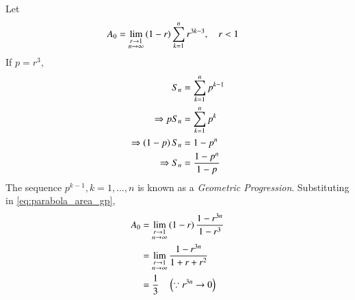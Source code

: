 \documentclass[journal,12pt,twocolumn]{IEEEtran}
\begin{document}
\solution Let 
\begin{align}
\label{eq:parabola_area_gp}
A_0 &= \lim_{\substack{r \to 1 \\ n \to \infty}}\left(1-r\right)\sum_{k=1}^{n}r^{3k-3}, \quad r < 1
\end{align}
If $p = r^3$,
\begin{align}
S_n &= \sum_{k=1}^{n}p^{k-1}
\\
\Rightarrow pS_n &= \sum_{k=1}^{n}p^{k}
\\
\Rightarrow \left(1-p\right)S_n &= 1 - p^{n}
\\
\Rightarrow S_n &= \frac{1-p^n}{1-p} 
\end{align}
The sequence $p^{k-1}, k = 1, \dots, n$ is known as a {\em Geometric Progression}.  Substituting in \eqref{eq:parabola_area_gp},
%
\begin{align}
A_0 &= \lim_{\substack{r \to 1 \\ n \to \infty}}\left(1-r\right)\frac{1-r^{3n}}{1-r^3}
\\
&= \lim_{\substack{r \to 1 \\ n \to \infty}}\frac{1-r^{3n}}{1+r+r^2}
\\
&= \frac{1}{3} \quad \left(\because r^{3n} \to 0\right)
\end{align}
\end{document}
